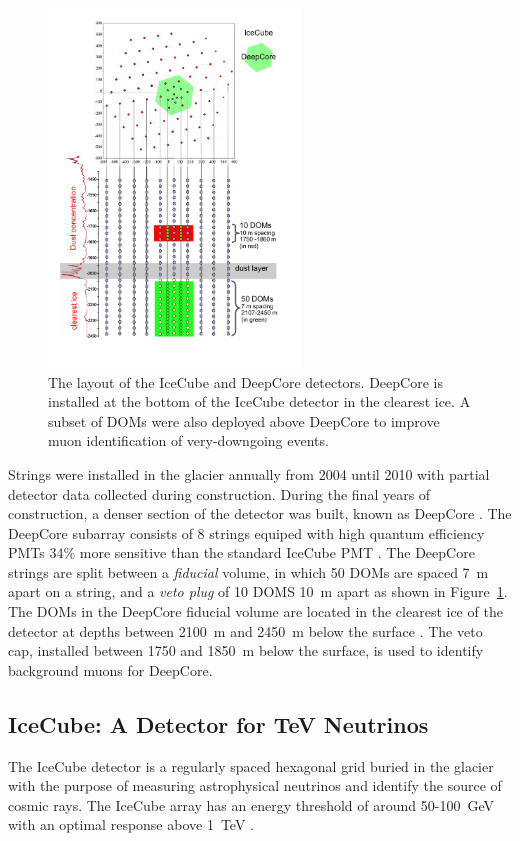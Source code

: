 \begin{figure}
\centering
\includegraphics[width=0.6\textwidth]{dc_layout.pdf} 
\caption[The IceCube and DeepCore string geometry]{The layout of the IceCube and DeepCore detectors. DeepCore is installed at the bottom of the IceCube detector in the clearest ice. A subset of DOMs were also deployed above DeepCore to improve muon identification of very-downgoing events.}
\label{fig:deepcore_layout}
\end{figure}

Strings were installed in the glacier annually from 2004 until 2010 with partial detector data collected during construction.
During the final years of construction, a denser section of the detector was built, known as DeepCore \cite{Description-DeepCore}.
The DeepCore subarray consists of 8 strings equiped with high quantum efficiency PMTs 34\% more sensitive than the standard IceCube PMT \cite{IceCube-PMT}.
The DeepCore strings are split between a \emph{fiducial} volume, in which 50 DOMs are spaced 7~m apart on a string, and a \emph{veto plug} of 10 DOMS 10~m apart as shown in Figure~\ref{fig:deepcore_layout}.
The DOMs in the DeepCore fiducial volume are located in the clearest ice of the detector at depths between 2100~m and 2450~m below the surface \cite{IceCube-SpiceMie}.
The veto cap, installed between 1750 and 1850~m below the surface, is used to identify background muons for DeepCore.

\subsection{IceCube: A Detector for TeV Neutrinos}
\label{subsec:icecube}
The IceCube detector is a regularly spaced hexagonal grid buried in the glacier with the purpose of measuring astrophysical neutrinos and identify the source of cosmic rays.
The IceCube array has an energy threshold of around 50-100~GeV with an optimal response above 1~TeV \cite{Description-DeepCore, Description-IceCube}.

